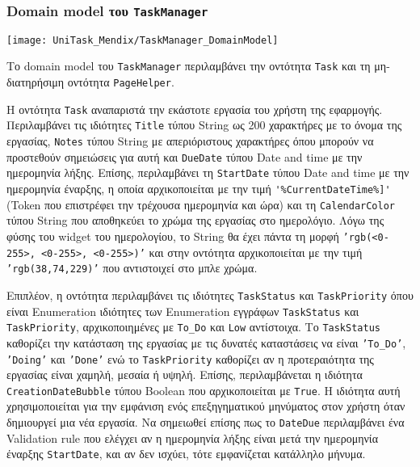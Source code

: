             \subsubsection{Domain model του \texttt{TaskManager}}
                \begin{center}
                    \texttt{[image: UniTask\_Mendix/TaskManager\_DomainModel]}
                \end{center}

                Το domain model του \texttt{TaskManager} περιλαμβάνει την οντότητα \texttt{Task} και τη μη-διατηρήσιμη οντότητα \texttt{PageHelper}.

                Η οντότητα \texttt{Task} αναπαριστά την εκάστοτε εργασία του χρήστη της εφαρμογής. Περιλαμβάνει τις ιδιότητες \texttt{Title} τύπου String ως 200 χαρακτήρες με το όνομα της εργασίας, \texttt{Notes} τύπου String με απεριόριστους χαρακτήρες όπου μπορούν να προστεθούν σημειώσεις για αυτή και \texttt{DueDate} τύπου Date and time με την ημερομηνία λήξης. Επίσης, περιλαμβάνει τη \texttt{StartDate} τύπου Date and time με την ημερομηνία έναρξης, η οποία αρχικοποιείται με την τιμή \verb|'%CurrentDateTime%]'| (Token που επιστρέφει την τρέχουσα ημερομηνία και ώρα) και τη \texttt{CalendarColor} τύπου String που αποθηκεύει το χρώμα της εργασίας στο ημερολόγιο. Λόγω της φύσης του widget του ημερολογίου, το String θα έχει πάντα τη μορφή \texttt{'rgb(<0-255>, <0-255>, <0-255>)'} και στην οντότητα αρχικοποιείται με την τιμή \texttt{'rgb(38,74,229)'} που αντιστοιχεί στο μπλε χρώμα.

                Επιπλέον, η οντότητα περιλαμβάνει τις ιδιότητες \texttt{TaskStatus} και \texttt{TaskPriority} όπου είναι Enumeration ιδιότητες των Enumeration εγγράφων \texttt{TaskStatus} και \linebreak \texttt{TaskPriority}, αρχικοποιημένες με \texttt{To\_Do} και \texttt{Low} αντίστοιχα. Το \texttt{TaskStatus} καθορίζει την κατάσταση της εργασίας με τις δυνατές καταστάσεις να είναι \texttt{'To\_Do'}, \texttt{'Doing'} και \texttt{'Done'} ενώ το \texttt{TaskPriority} καθορίζει αν η προτεραιότητα της εργασίας είναι χαμηλή, μεσαία ή υψηλή. Επίσης, περιλαμβάνεται η ιδιότητα \texttt{CreationDateBubble} τύπου Boolean που αρχικοποιείται με \texttt{True}. Η ιδιότητα αυτή χρησιμοποιείται για την εμφάνιση ενός επεξηγηματικού μηνύματος στον χρήστη όταν δημιουργεί μια νέα εργασία. Να σημειωθεί επίσης πως το \texttt{DateDue} περιλαμβάνει ένα Validation rule που ελέγχει αν η ημερομηνία λήξης είναι μετά την ημερομηνία έναρξης \texttt{StartDate}, και αν δεν ισχύει, τότε εμφανίζεται κατάλληλο μήνυμα.

